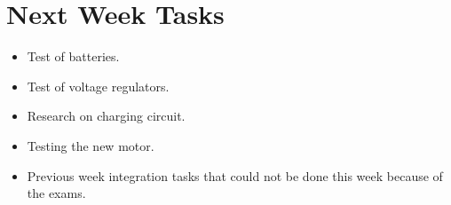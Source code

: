 \section{Next Week Tasks}
\label{sec:nextWeekTasks}
\begin{itemize}
    \item Test of batteries.
    \item Test of voltage regulators.
    \item Research on charging circuit.
    \item Testing the new motor.
    \item Previous week integration tasks that could not be done this week because of the exams.
\end{itemize}
